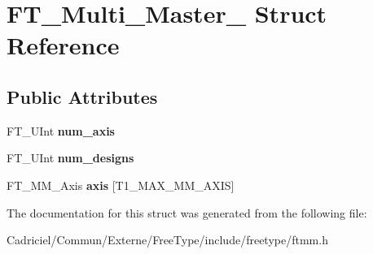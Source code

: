\hypertarget{struct_f_t___multi___master__}{\section{F\-T\-\_\-\-Multi\-\_\-\-Master\-\_\- Struct Reference}
\label{struct_f_t___multi___master__}
}
\subsection*{Public Attributes}
\begin{DoxyCompactItemize}
\item 
\hypertarget{struct_f_t___multi___master___a90a0ace4e40b91912259ad52fc86fb6f}{F\-T\-\_\-\-U\-Int {\bfseries num\-\_\-axis}}\label{struct_f_t___multi___master___a90a0ace4e40b91912259ad52fc86fb6f}

\item 
\hypertarget{struct_f_t___multi___master___a78b797ee560f4b00795a7dce9656178d}{F\-T\-\_\-\-U\-Int {\bfseries num\-\_\-designs}}\label{struct_f_t___multi___master___a78b797ee560f4b00795a7dce9656178d}

\item 
\hypertarget{struct_f_t___multi___master___a1eb062ff3b5ac245ab9421a46b349818}{F\-T\-\_\-\-M\-M\-\_\-\-Axis {\bfseries axis} \mbox{[}T1\-\_\-\-M\-A\-X\-\_\-\-M\-M\-\_\-\-A\-X\-I\-S\mbox{]}}\label{struct_f_t___multi___master___a1eb062ff3b5ac245ab9421a46b349818}

\end{DoxyCompactItemize}


The documentation for this struct was generated from the following file\-:\begin{DoxyCompactItemize}
\item 
Cadriciel/\-Commun/\-Externe/\-Free\-Type/include/freetype/ftmm.\-h\end{DoxyCompactItemize}
